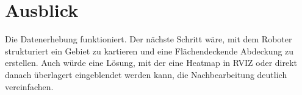 \documentclass{scrartcl}%
\begin{document}
\section{Ausblick}
Die Datenerhebung funktioniert. Der nächste Schritt wäre, mit dem Roboter strukturiert ein Gebiet zu kartieren und eine Flächendeckende Abdeckung zu erstellen. Auch würde eine Lösung, mit der eine Heatmap in RVIZ oder direkt danach überlagert eingeblendet werden kann, die Nachbearbeitung deutlich vereinfachen.



\begin{flushleft}
	\printbibliography
\end{flushleft}
\end{document}
